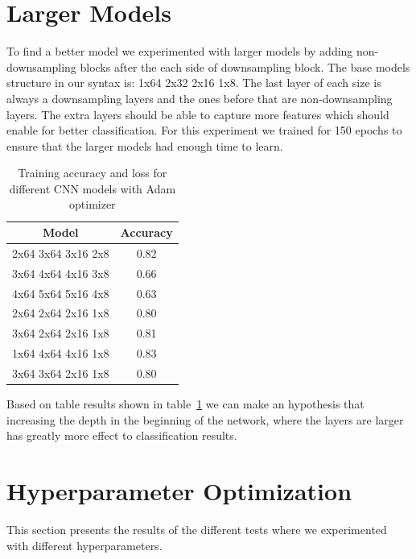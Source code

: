 \documentclass[12pt,a4paper,english
]{tunithesis}
\begin{document}
\section{Larger Models}

To find a better model we experimented with larger models by adding non-downsampling blocks after the each side of downsampling block. The base models structure in our syntax is: 1x64 2x32 2x16 1x8. The last layer of each size is always a downsampling layers and the ones before that are non-downsampling layers. The extra layers should be able to capture more features which should enable for better classification. For this experiment we trained for 150 epochs to ensure that the larger models had enough time to learn.

\begin{table}[h!]
\centering
\caption{Training accuracy and loss for different CNN models with Adam optimizer}
\begin{tabular}{|c|c|}
\hline
\textbf{Model} & \textbf{Accuracy}  \\ \hline
2x64 3x64 3x16 2x8 & 0.82 \\ \hline
3x64 4x64 4x16 3x8 & 0.66 \\ \hline
4x64 5x64 5x16 4x8 & 0.63 \\ \hline
2x64 2x64 2x16 1x8 & 0.80 \\ \hline
3x64 2x64 2x16 1x8 & 0.81 \\ \hline
1x64 4x64 4x16 1x8 & 0.83 \\ \hline
3x64 3x64 2x16 1x8 & 0.80 \\ \hline
\end{tabular}
\label{tab:models}
\end{table}

Based on table results shown in table~\ref{tab:models} we can make an hypothesis that increasing the depth in the beginning of the network, where the layers are larger has greatly more effect to classification results.

\section{Hyperparameter Optimization}
This section presents the results of the different tests where we experimented with different hyperparameters.
\end{document}
